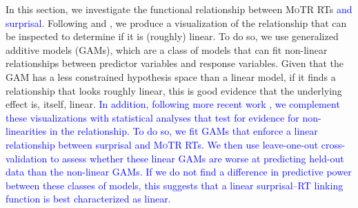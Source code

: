 \documentclass[12pt]{article}
\newcommand{\motr}{\textsc{MoTR}\xspace}
\newcommand{\change}[1]{\textcolor{blue}{#1}}
\begin{document}
{In this section, we investigate the functional relationship between \motr RTs \change{and surprisal}. Following \citet{smith2013effect} and \citet{wilcox2020predictive}, we produce a visualization of the relationship that can be inspected to determine if it is (roughly) linear. To do so, we use generalized additive models (GAMs), which are a class of models that can fit non-linear relationships between predictor variables and response variables. Given that the GAM has a less constrained hypothesis space than a linear model, if it finds a relationship that looks roughly linear, this is good evidence that the underlying effect is, itself, linear. \change{In addition, following more recent work \citep{hoover-etal-2021-linguistic, meister-etal-2021-revisiting, shain2022large, wilcox2023testing}, we complement these visualizations with statistical analyses that test for evidence for non-linearities in the relationship. To do so, we fit GAMs that enforce a linear relationship between surprisal and \motr RTs. We then use leave-one-out cross-validation to assess whether these linear GAMs are worse at predicting held-out data than the non-linear GAMs. If we do not find a difference in predictive power between these classes of models, this suggests that a linear surprisal--RT linking function is best characterized as linear.} 

}
\end{document}
